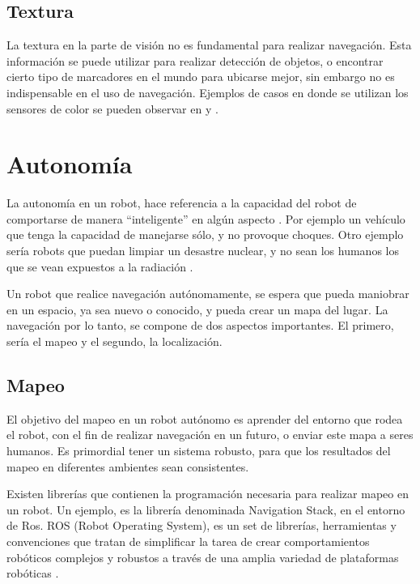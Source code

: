 \subsection{Textura}

La textura en la parte de visión no es fundamental para realizar navegación. Esta información se puede utilizar para realizar detección de objetos, o encontrar cierto tipo de marcadores en el mundo para ubicarse mejor, sin embargo no es indispensable en el uso de navegación. Ejemplos de casos en donde se utilizan los sensores de color se pueden observar en \cite{Manduchi2005} y \cite{Lai2011}.


\section{Autonomía}

La autonomía en un robot, hace referencia a la capacidad del robot de comportarse de manera ``inteligente'' en algún aspecto \cite{Thrun2005}. Por ejemplo un vehículo que tenga la capacidad de manejarse sólo, y no provoque choques. Otro ejemplo sería robots que puedan limpiar un desastre nuclear, y no sean los humanos los que se vean expuestos a la radiación \cite{Thrun2005}.

Un robot que realice navegación autónomamente, se espera que pueda maniobrar en un espacio, ya sea nuevo o conocido, y pueda crear un mapa del lugar. La navegación por lo tanto, se compone de dos aspectos importantes. El primero, sería el mapeo y el segundo, la localización.

\subsection{Mapeo}

El objetivo del mapeo en un robot autónomo es aprender del entorno que rodea el robot, con el fin de realizar navegación en un futuro, o enviar este mapa a seres humanos. Es primordial tener un sistema robusto, para que los resultados del mapeo en diferentes ambientes sean consistentes.

Existen librerías que contienen la programación necesaria para realizar mapeo en un robot. Un ejemplo, es la librería denominada Navigation Stack, en el entorno de Ros. ROS (Robot Operating System), es un set de librerías, herramientas y convenciones que tratan de simplificar la tarea de crear comportamientos robóticos complejos y robustos a través de una amplia variedad de plataformas robóticas \cite{Quigley2009}.

